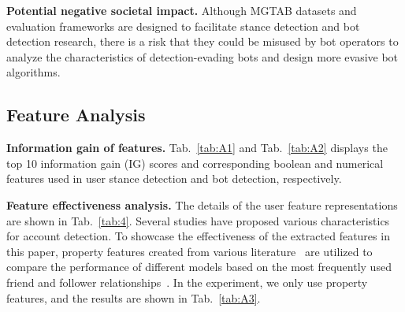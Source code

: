 \documentclass[10pt,twocolumn,letterpaper]{article}
\begin{document}
\noindent
\textbf{Potential negative societal impact.}
Although MGTAB datasets and evaluation frameworks are designed to facilitate stance detection and bot detection research, there is a risk that they could be misused by bot operators to analyze the characteristics of detection-evading bots and design more evasive bot algorithms.


\subsection{Feature Analysis}
\label{sec:FeatureAnalysis}
\noindent
\textbf{Information gain of features.}
Tab.~\ref{tab:A1} and Tab.~\ref{tab:A2} displays the top 10 information gain (IG) scores and corresponding boolean and numerical features used in user stance detection and bot detection, respectively.

	
\noindent
\textbf{Feature effectiveness analysis.}
The details of the user feature representations are shown in Tab.~\ref{tab:4}. Several studies have proposed various characteristics for account detection. To showcase the effectiveness of the extracted features in this paper, property features created from various literature~\cite{Alpher06,Alpher39,Alpher50} are utilized to compare the performance of different models based on the most frequently used friend and follower relationships~\cite{Alpher06}. In the experiment, we only use property features, and the results are shown in Tab.~\ref{tab:A3}.
\end{document}
